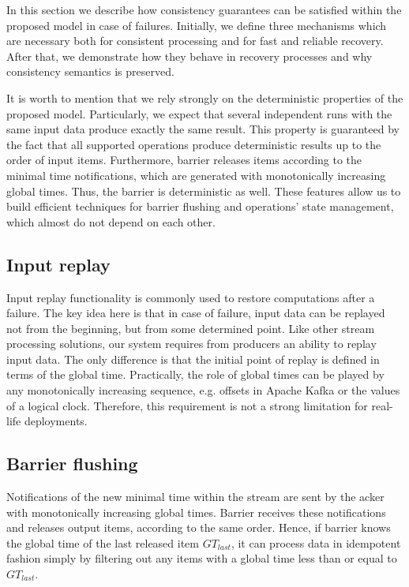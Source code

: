 
\label {fs-consistency-seciton}

In this section we describe how consistency guarantees can be satisfied within the proposed model in case of failures. Initially, we define three mechanisms which are necessary both for consistent processing and for fast and reliable recovery. After that, we demonstrate how they behave in recovery processes and why consistency semantics is preserved.

It is worth to mention that we rely strongly on the deterministic properties of the proposed model. Particularly, we expect that several independent runs with the same input data produce exactly the same result. This property is guaranteed by the fact that all supported operations produce deterministic results up to the order of input items. Furthermore, barrier releases items according to the minimal time notifications, which are generated with monotonically increasing global times. Thus, the barrier is deterministic as well. These features allow us to build efficient techniques for barrier flushing and operations' state management, which almost do not depend on each other.  

\subsection{Input replay}
Input replay functionality is commonly used to restore computations after a failure. The key idea here is that in case of failure, input data can be replayed not from the beginning, but from some determined point. Like other stream processing solutions, our system requires from producers an ability to replay input data. The only difference is that the initial point of replay is defined in terms of the global time. Practically, the role of global times can be played by any monotonically increasing sequence, e.g. offsets in Apache Kafka or the values of a logical clock. Therefore, this requirement is not a strong limitation for real-life deployments.

\subsection{Barrier flushing}
Notifications of the new minimal time within the stream are sent by the acker with monotonically increasing global times. Barrier receives these notifications and releases output items, according to the same order. Hence, if barrier knows the global time of the last released item $GT_{last}$, it can process data in idempotent fashion simply by filtering out any items with a global time less than or equal to $GT_{last}$. 

